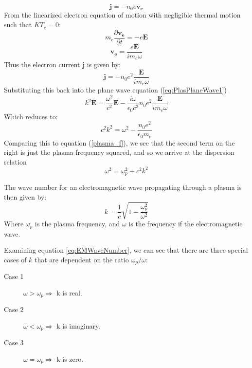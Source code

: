 \documentclass[twocolumn]{article}
\begin{document}
\begin{equation}
	\mathbf{j} = -n_0e\mathbf{v_e}
\end{equation}
From the linearized electron equation of motion with negligible thermal motion such that $KT_e = 0$:
\begin{equation}
	m_e\frac{\partial \mathbf{v_e}}{\partial t} = -e\mathbf{E}
\end{equation}
\begin{equation}
	\mathbf{v_e} = \frac{e\mathbf{E}}{im_e\omega}
\end{equation}
Thus the electron current $\mathbf{j}$ is given by:
\begin{equation}
	\mathbf{j} = -n_0e^2\frac{\mathbf{E}}{im_e\omega}
\end{equation}
Substituting this back into the plane wave equation (\ref{eq:PlasPlaneWave1})
\begin{equation}
	k^2\mathbf{E} = \frac{\omega^2}{c^2}\mathbf{E} - \frac{i\omega}{\epsilon_0 c^2}n_0e^2\frac{\mathbf{E}}{im_e\omega}
\end{equation}
Which reduces to:
\begin{equation*}
	c^2k^2 = \omega^2 - \frac{n_0e^2}{\epsilon_0m_e}
\end{equation*}
Comparing this to equation (\ref{plasma_f}), we see that the second term on the right is just the plasma frequency squared, and so we arrive at the dispersion relation
\begin{equation}
	\omega^2 = \omega^2_p + c^2k^2
\end{equation}

The wave number for an electromagnetic wave propagating through a plasma is then given by:
\begin{equation}
	\label{eq:EMWaveNumber}
	k = \frac{1}{c}\sqrt{1-\frac{\omega^2_p}{\omega^2}}	
\end{equation}
Where $\omega_p$ is the plasma frequency, and $\omega$ is the frequency if the electromagnetic wave.

Examining equation \ref{eq:EMWaveNumber}, we can see that there are three special cases of $k$ that are dependent on the ratio $\omega_p/\omega$:
\begin{description}
	\item [Case 1]$\omega > \omega_p \Rightarrow$ k is real.
	\item [Case 2]$\omega < \omega_p \Rightarrow$ k is imaginary.
	\item [Case 3]$\omega = \omega_p \Rightarrow$ k is zero.
\end{description}
\end{document}
